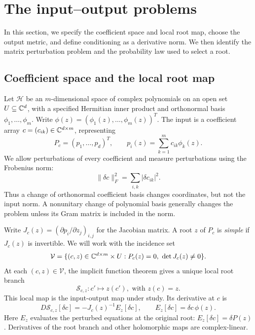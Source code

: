 \section{The input--output problems}\label{sec:setup}

In this section, we specify the coefficient space and local
root map, choose the output metric, and define conditioning as a derivative
norm. We then identify the matrix perturbation problem and the probability law
used to select a root.

\subsection{Coefficient space and the local root map}
Let $\mathcal H$ be an $m$-dimensional space of complex polynomials on an open
set $U\subseteq\mathbb C^d$, with a specified Hermitian inner product and orthonormal
basis $\phi_1,\ldots,\phi_m$. Write
$\phi(z)=(\phi_1(z),\ldots,\phi_m(z))^T$. 
The input is a coefficient array $c=(c_{ik})\in\mathbb C^{d\times m}$, representing
\[
 P_c=(p_1,\ldots,p_d)^T,\qquad
 p_i(z)=\sum_{k=1}^m c_{ik}\phi_k(z).
\]
We allow perturbations of every coefficient and measure perturbations using the Frobenius norm:
\[
 \|\delta c\|_F^2=\sum_{i,k}|\delta c_{ik}|^2.
\]
Thus a change of orthonormal coefficient basis changes coordinates, but not the
input norm. A nonunitary change of polynomial basis generally changes the
problem unless its Gram matrix is included in the norm.

Write $J_c(z)=(\partial p_i/\partial z_j)_{i,j}$ for the Jacobian matrix.
A root $z$ of $P_c$ is \emph{simple} if $J_c(z)$ is invertible. We will work
with the incidence set
\[
 \mathcal V=\{(c,z)\in\mathbb C^{d\times m}\times U:
                  P_c(z)=0,\ \det J_c(z)\ne0\}.
\]
At each $(c,z)\in\mathcal V$, the implicit function theorem gives a unique local
root branch 
\begin{equation}\label{eq:setup-root-branch}
   \mathcal S_{c,z}\colon c'\mapsto z(c'), \text{ with } z(c)=z.
\end{equation}   
This local map is the input-output map under study.
Its derivative at $c$ is
\begin{equation}\label{eq:setup-root-derivative}
 D\mathcal S_{c,z}[\delta c]=-J_c(z)^{-1}E_z[\delta c],
 \qquad E_z[\delta c]=\delta c\,\phi(z).
\end{equation}
Here $E_z$ evaluates the perturbed equations at the original root:
$E_z[\delta c]=\delta P(z)$. Derivatives of the root branch and other
holomorphic maps are complex-linear.

